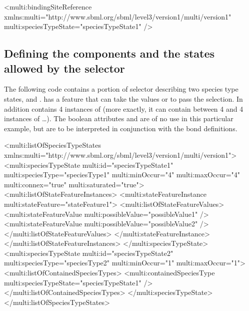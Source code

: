 \begin{example}
<multi:bindingSiteReference 
                    xmlns:multi="http://www.sbml.org/sbml/level3/version1/multi/version1" 
                    multi:speciesTypeState="speciesTypeState1" />
\end{example}

\subsection{Defining the components and the states allowed by the selector}

The following code contains a portion of selector describing two species type states,  and .  has a feature  that can take the values  or  to pass the selection. In addition  contains 4 instances of  (more exactly, it can contain between 4 and 4  instances of  \ldots). The boolean attributes  and  are of no use in this particular example, but are to be interpreted in conjunction with the bond definitions. 

\begin{example}
<multi:listOfSpeciesTypeStates
                  xmlns:multi="http://www.sbml.org/sbml/level3/version1/multi/version1">
  <multi:speciesTypeState multi:id="speciesTypeState1" multi:speciesType="speciesType1" 
                          multi:minOccur="4" multi:maxOccur="4" 
                          multi:connex="true" multi:saturated="true">
    <multi:listOfStateFeatureInstances>
      <multi:stateFeatureInstance multi:stateFeature="stateFeature1">
        <multi:listOfStateFeatureValues>
          <multi:stateFeatureValue multi:possibleValue="possibleValue1" />
          <multi:stateFeatureValue multi:possibleValue="possibleValue2" />
        </multi:listOfStateFeatureValues>
      </multi:stateFeatureInstance>
    </multi:listOfStateFeatureInstances>
  </multi:speciesTypeState>
  <multi:speciesTypeState multi:id="speciesTypeState2" multi:speciesType="speciesType2"
                          multi:minOccur="1" multi:maxOccur="1">
    <multi:listOfContainedSpeciesTypes>
      <multi:containedSpeciesType multi:speciesTypeState="speciesTypeState1" />
    </multi:listOfContainedSpeciesTypes>
  </multi:speciesTypeState>
</multi:listOfSpeciesTypeStates>
\end{example}

